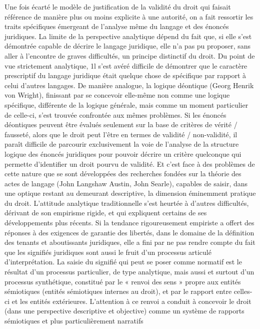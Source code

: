 Une fois écarté le modèle de justification de la validité du droit qui faisait référence de manière plus ou moins explicite
à une autorité, on a fait ressortir les traits
%
spécifiques émergeant de l’analyse même
du langage et des énoncés juridiques. La
limite de la perspective analytique dépend
du fait que, si elle s’est démontrée capable
de décrire le langage juridique, elle n’a
pas pu proposer, sans aller à l’encontre de
graves difficultés, un principe distinctif du
droit. Du point de vue strictement analytique, 1l s’est avéré difficile de démontrer
que le caractère prescriptif du langage
juridique était quelque chose de spécifique par rapport à celui d’autres langages. De manière analogue, la logique
déontique (Georg Henrik von Wright),
finissant par se concevoir elle-même non
comme une logique spécifique, différente
de la logique générale, mais comme un
moment particulier de celle-ci, s’est trouvée confrontée aux mêmes problèmes. Si
les énoncés déontiques peuvent être évalués seulement sur la base de critères de
vérité / fausseté, alors que le droit peut
l’être en termes de validité / non-validité,
il paraît difficile de parcourir exclusivement la voie de l’analyse de la structure
logique des énoncés juridiques pour pouvoir décrire un critère quelconque qui
permette d'identifier un droit pourvu de
validité. Et c’est face à des problèmes de
cette nature que se sont développées des
recherches fondées sur la théorie des
actes de langage (John Langshaw Austin,
John Searle), capables de saisir, dans une
optique restant au demeurant descriptive,
la dimension éminemment pratique du
droit. L’attitude analytique traditionnelle
s’est heurtée à d’autres difficultés, dérivant de son empirisme rigide, et qui expliquent certains de ses développements
plus récents. Si la tendance rigoureusement empiriste a offert des réponses à des
exigences de garantie des libertés, dans le
domaine de la définition des tenants et
aboutissants juridiques, elle a fini par ne
pas rendre compte du fait que les signifiés
juridiques sont aussi le fruit d’un processus articulé d'interprétation. La saisie du
signifié qui peut se poser comme normatif
est le résultat d’un processus particulier,
de type analytique, mais aussi et surtout
d’un processus synthétique, constitué par
le « renvoi des sens » propre aux entités
sémiotiques (entités sémiotiques internes
au droit), et par le rapport entre celles-ci
et les entités extérieures. L’attention à ce
renvoi a conduit à concevoir le droit (dans
une perspective descriptive et objective)
comme un système de rapports sémiotiques
%
 et plus particulièrement narratifs
